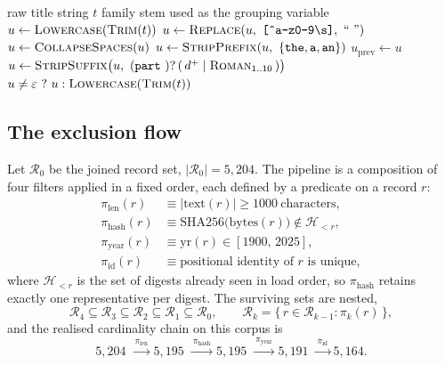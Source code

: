\documentclass[conference,a4paper]{IEEEtran}
\begin{document}
\begin{algorithm}[t]
\caption{Title-family key $\varphi(t)$}
\label{alg:fam}
\begin{algorithmic}[1]
\REQUIRE raw title string $t$
\ENSURE family stem used as the grouping variable
\STATE $u \leftarrow \textsc{Lowercase}(\textsc{Trim}(t))$
\STATE $u \leftarrow \textsc{Replace}(u,\ \texttt{[\^{}a-z0-9\textbackslash s]},\ \text{`` ''})$
\STATE $u \leftarrow \textsc{CollapseSpaces}(u)$
\STATE $u \leftarrow \textsc{StripPrefix}(u,\ \{\texttt{the},\texttt{a},\texttt{an}\})$
\REPEAT
  \STATE $u_{\text{prev}} \leftarrow u$
  \STATE $u \leftarrow \textsc{StripSuffix}\bigl(u,\ (\texttt{part}\ )?\,
         (\,d^{+} \mid \textsc{Roman}_{1..10}\,)\bigr)$
\RETURN $u \neq \varepsilon\ ?\ u : \textsc{Lowercase}(\textsc{Trim}(t))$
\end{algorithmic}
\end{algorithm}

\subsection{The exclusion flow}
\label{sec:flow}

Let $\mathcal{R}_0$ be the joined record set, $|\mathcal{R}_0| = 5{,}204$.
The pipeline is a composition of four filters applied in a fixed order,
each defined by a predicate on a record $r$:
\begin{align}
\pi_{\text{len}}(r)  &\equiv |\mathrm{text}(r)| \ge 1000 \ \text{characters},\\
\pi_{\text{hash}}(r) &\equiv \mathrm{SHA256}\bigl(\mathrm{bytes}(r)\bigr)
   \notin \mathcal{H}_{<r},\\
\pi_{\text{year}}(r) &\equiv \mathrm{yr}(r) \in [1900,\, 2025],\\
\pi_{\text{id}}(r)   &\equiv \text{positional identity of } r
   \text{ is unique},
\end{align}
where $\mathcal{H}_{<r}$ is the set of digests already seen in load order,
so $\pi_{\text{hash}}$ retains exactly one representative per digest. The
surviving sets are nested,
\begin{equation}
\label{eq:flow}
\mathcal{R}_4 \subseteq \mathcal{R}_3 \subseteq \mathcal{R}_2
\subseteq \mathcal{R}_1 \subseteq \mathcal{R}_0 ,
\qquad
\mathcal{R}_{k} = \{\, r \in \mathcal{R}_{k-1} : \pi_k(r) \,\},
\end{equation}
and the realised cardinality chain on this corpus is
\begin{equation}
\label{eq:chain}
5{,}204
\;\xrightarrow{\ \pi_{\text{len}}\ } 5{,}195
\;\xrightarrow{\ \pi_{\text{hash}}\ } 5{,}195
\;\xrightarrow{\ \pi_{\text{year}}\ } 5{,}191
\;\xrightarrow{\ \pi_{\text{id}}\ } 5{,}164 .
\end{equation}
\end{document}

